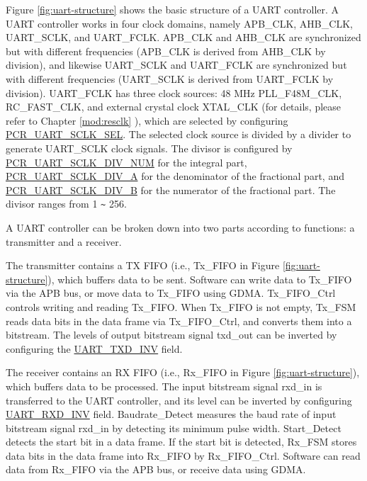 \documentclass[main\_\_EN.tex]{subfiles}
\begin{document}
Figure \ref{fig:uart-structure} shows the basic structure of a UART controller. A UART controller works in four clock domains, namely APB\_CLK, AHB\_CLK, UART\_SCLK, and UART\_FCLK. APB\_CLK and AHB\_CLK are synchronized but with different frequencies (APB\_CLK is derived from AHB\_CLK by division), and likewise UART\_SCLK and UART\_FCLK are synchronized but with different frequencies (UART\_SCLK is derived from UART\_FCLK by division). UART\_FCLK has three clock sources: 48 MHz PLL\_F48M\_CLK, RC\_FAST\_CLK, and external crystal clock XTAL\_CLK (for details, please refer to Chapter \ref{mod:resclk} \textit{}), which are selected by configuring \hyperref[fielddesc:PCRUART0SCLKSEL]{PCR\_UART\_SCLK\_SEL}. The selected clock source is divided by a divider to generate UART\_SCLK clock signals. The divisor is configured by \hyperref[fielddesc:PCRUART0SCLKDIVNUM]{PCR\_UART\_SCLK\_DIV\_NUM} for the integral part, \hyperref[fielddesc:PCRUART0SCLKDIVA]{PCR\_UART\_SCLK\_DIV\_A} for the denominator of the fractional part, and \hyperref[fielddesc:PCRUART0SCLKDIVB]{PCR\_UART\_SCLK\_DIV\_B} for the numerator of the fractional part. The divisor ranges from 1 \verb+~+ 256.

A UART controller can be broken down into two parts according to functions: a transmitter and a receiver.

The transmitter contains a TX FIFO (i.e., Tx\_FIFO in Figure \ref{fig:uart-structure}), which buffers data to be sent. Software can write data to Tx\_FIFO via the APB bus, or move data to Tx\_FIFO using GDMA. Tx\_FIFO\_Ctrl controls writing and reading Tx\_FIFO. When Tx\_FIFO is not empty, Tx\_FSM reads data bits in the data frame via Tx\_FIFO\_Ctrl, and converts them into a bitstream. The levels of output bitstream signal txd\_out can be inverted by configuring the \hyperref[fielddesc:UARTTXDINV]{UART\_TXD\_INV} field.

The receiver contains an RX FIFO (i.e., Rx\_FIFO in Figure \ref{fig:uart-structure}), which buffers data to be processed. The input bitstream signal rxd\_in is transferred to the UART controller, and its level can be inverted by configuring \hyperref[fielddesc:UARTRXDINV]{UART\_RXD\_INV} field. Baudrate\_Detect measures the baud rate of input bitstream signal rxd\_in by detecting its minimum pulse width. Start\_Detect detects the start bit in a data frame. If the start bit is detected, Rx\_FSM stores data bits in the data frame into Rx\_FIFO by Rx\_FIFO\_Ctrl. Software can read data from Rx\_FIFO via the APB bus, or receive data using GDMA. 
\end{document}
